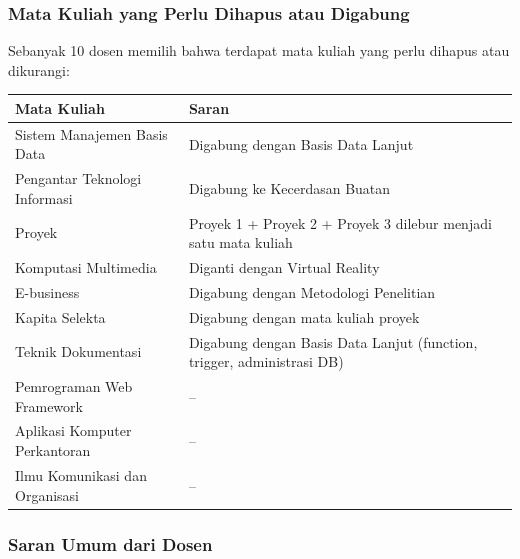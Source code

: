 \begin{minipage}[t]{0.48\linewidth}
\subsubsection{Mata Kuliah yang Perlu Dihapus atau Digabung}

Sebanyak 10 dosen memilih bahwa terdapat mata kuliah yang perlu dihapus atau dikurangi:

\centering
\small
\begin{tabular}{L{2.3cm}L{4.3cm}}
\toprule
Mata Kuliah & Saran \\
\midrule
Sistem Manajemen Basis Data & Digabung dengan Basis Data Lanjut \\
Pengantar Teknologi Informasi & Digabung ke Kecerdasan Buatan \\
Proyek & Proyek 1 + Proyek 2 + Proyek 3 dilebur menjadi satu mata kuliah \\
Komputasi Multimedia & Diganti dengan Virtual Reality \\
E-business & Digabung dengan Metodologi Penelitian \\
Kapita Selekta & Digabung dengan mata kuliah proyek \\
Teknik Dokumentasi & Digabung dengan Basis Data Lanjut (function, trigger, administrasi DB) \\
Pemrograman Web Framework & -- \\
Aplikasi Komputer Perkantoran & -- \\
Ilmu Komunikasi dan Organisasi & -- \\
\bottomrule
\end{tabular}
\end{minipage}

\subsubsection{Saran Umum dari Dosen}

